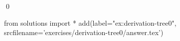 
\begin{ex} 
  \label{ex:derivation-tree0}
  
  \qed
\end{ex} 
\begin{python0}
from solutions import *
add(label="ex:derivation-tree0",
    srcfilename='exercises/derivation-tree0/answer.tex') 
\end{python0}
